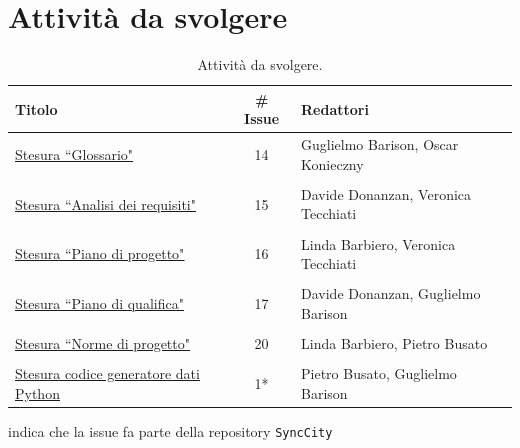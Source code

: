 \documentclass[8pt]{article}
\begin{document}
\section{Attività da svolgere}
\begin{table}[ht!]
	\centering
	\begin{tabular}{lcl}
		\toprule
		\textbf{Titolo} & \textbf{\# Issue} & \textbf{Redattori} \\
		\midrule
		\href{https://github.com/NaN1fy/docs/issues/14}{\underline{Stesura ``Glossario"}} & 14 & Guglielmo Barison, Oscar Konieczny\\\\
		\href{https://github.com/NaN1fy/docs/issues/15}{\underline{Stesura ``Analisi dei requisiti"}} & 15 & Davide Donanzan, Veronica Tecchiati\\\\
		\href{https://github.com/NaN1fy/docs/issues/16}{\underline{Stesura ``Piano di progetto"}}  & 16 & Linda Barbiero, Veronica Tecchiati\\\\
		\href{https://github.com/NaN1fy/docs/issues/17}{\underline{Stesura ``Piano di qualifica"}} & 17 & Davide Donanzan, Guglielmo Barison\\\\
		\href{https://github.com/NaN1fy/docs/issues/20}{\underline{Stesura ``Norme di progetto"}} & 20 & Linda Barbiero, Pietro Busato\\\\
		\href{https://github.com/NaN1fy/SyncCity/issues/1}{\underline{Stesura codice generatore dati Python}} & 1*\tnote{*} & Pietro Busato, Guglielmo Barison\\
		\bottomrule
	\end{tabular}
	\begin{tablenotes}
		\vspace{1em}
		\item * indica che la issue fa parte della repository \texttt{SyncCity}
	\end{tablenotes}
	\caption{Attività da svolgere.}
	\label{table:Attivita da svolgere}
\end{table}
\end{document}
